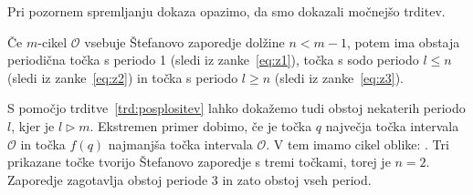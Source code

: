 \documentclass[../TG_magistrsko_delo_sections.tex]{subfiles}
\begin{document}
Pri pozornem spremljanju dokaza opazimo, da smo dokazali močnejšo trditev.

\begin{trditev}\label{trd:posplositev}
Če $m$-cikel $\mathcal{O}$ vsebuje Štefanovo zaporedje dolžine $n<m-1$, potem ima obstaja periodična točka s periodo 1 (sledi iz zanke~\ref{eq:z1}), točka s sodo periodo $l \leq n$ (sledi iz zanke~\ref{eq:z2}) in točka s periodo $l \geq n$ (sledi iz zanke~\ref{eq:z3}).
\end{trditev}

S pomočjo trditve~\ref{trd:posplositev} lahko dokažemo tudi obstoj nekaterih periodo $l$, kjer je $l \triangleright m$. 
Ekstremen primer dobimo, če je točka $q$ največja točka intervala $\mathcal{O}$ in točka $f(q)$ najmanjša točka intervala $\mathcal{O}$.  V tem imamo cikel oblike:
.
Tri prikazane točke tvorijo Štefanovo zaporedje s tremi točkami, torej je $n=2$. Zaporedje zagotavlja obstoj periode 3 in zato obstoj vseh period.
\end{document}

